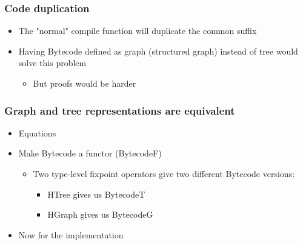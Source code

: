         \begin{frame}
            \frametitle{Code duplication}

            \begin{itemize}
                \item The "normal" compile function will duplicate the common suffix
                \item Having Bytecode defined as graph (structured graph) instead of tree
                    would solve this problem
                    \begin{itemize}
                        \item But proofs would be harder
                    \end{itemize}
            \end{itemize}
        \end{frame}

        \begin{frame}
            \frametitle{Graph and tree representations are equivalent}

            \begin{itemize}
                \item Equations
                \item Make Bytecode a functor (BytecodeF)
                    \begin{itemize}
                        \item Two type-level fixpoint operators give two different Bytecode versions:
                        \begin{itemize}
                            \item HTree gives us BytecodeT
                            \item HGraph gives us BytecodeG
                        \end{itemize}
                    \end{itemize}

                \item Now for the implementation
            \end{itemize}
        \end{frame}


